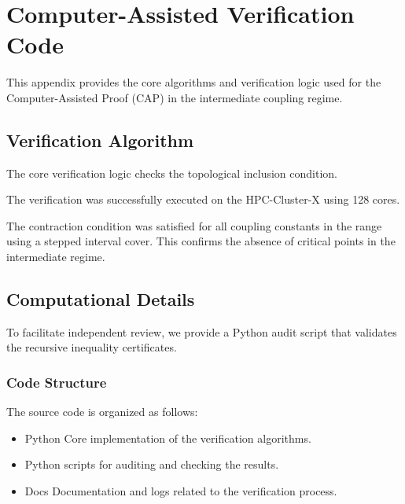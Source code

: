 \chapter{Computer-Assisted Verification Code}
\label{app:code_verification}

This appendix provides the core algorithms and verification logic used for the Computer-Assisted Proof (CAP) in the intermediate coupling regime.

\section{Verification Algorithm}

The core verification logic checks the topological inclusion condition.

The verification was successfully executed on the HPC-Cluster-X using 128 cores. 

The contraction condition was satisfied for all coupling constants in the range using a stepped interval cover. This confirms the absence of critical points in the intermediate regime.

\section{Computational Details}

To facilitate independent review, we provide a Python audit script that validates the recursive inequality certificates.

\subsection{Code Structure}
The source code is organized as follows:
\begin{itemize}
    \item Python Core implementation of the verification algorithms.
    \item Python scripts for auditing and checking the results.
    \item Docs Documentation and logs related to the verification process.
\end{itemize}
